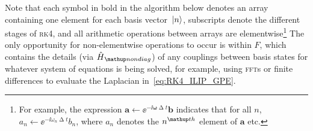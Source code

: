 Note that each symbol in bold in the algorithm below denotes an array containing one element for each basis vector $\ket{n}$, subscripts denote the different stages of \textsc{rk4}, and all arithmetic operations between arrays are elementwise\footnote{For example, the expression \mbox{$\mathbf{a}\leftarrow \ee^{-\ii\mathbf{\omega}\upDelta t}\mathbf{b}$} indicates that for all $n$, \mbox{$a_n\leftarrow \ee^{-\ii\omega_n\upDelta t}b_n$}, where $a_n$ denotes the $n^\up{th}$ element of $\mathbf{a}$ etc.} The only opportunity for non-elementwise operations to occur is within $F$, which contains the details (via $\hat H_\up{nondiag}$) of any couplings between basis states for whatever system of equations is being solved, for example, using \textsc{fft}s or finite differences to evaluate the Laplacian in~\eqref{eq:RK4_ILIP_GPE}.


